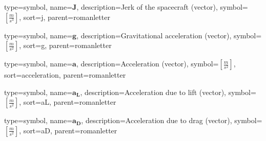 {
type=symbol, %
name={\ensuremath{\mathbf{J}}}, %
description={Jerk of the spacecraft (vector)}, %
symbol={$\left[\frac{m}{s^3}\right]$}, %
sort=j, %
parent=romanletter %
}

{
type=symbol, %
name={\ensuremath{\mathbf{g}}}, %
description={Gravitational acceleration (vector)}, %
symbol={$\left[\frac{m}{s^2}\right]$}, %
sort=g, %
parent=romanletter %
}

{
type=symbol, %
name={\ensuremath{\mathbf{a}}}, %
description={Acceleration (vector)}, %
symbol={$\left[\frac{m}{s^2}\right]$}, %
sort=acceleration, %
parent=romanletter %
}

{
type=symbol, %
name={\ensuremath{\mathbf{a_L}}}, %
description={Acceleration due to lift (vector)}, %
symbol={$\left[\frac{m}{s^2}\right]$}, %
sort=aL, %
parent=romanletter %
}

{
type=symbol, %
name={\ensuremath{\mathbf{a_D}}}, %
description={Acceleration due to drag (vector)}, %
symbol={$\left[\frac{m}{s^2}\right]$}, %
sort=aD, %
parent=romanletter %
}

